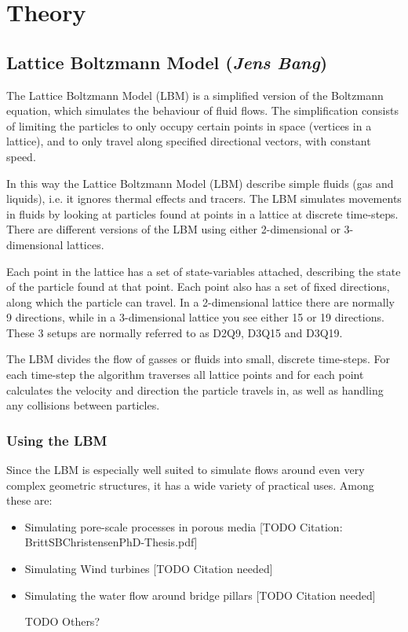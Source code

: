 \section{Theory}

\subsection{Lattice Boltzmann Model (\textit{Jens Bang})}
The Lattice Boltzmann Model (LBM) is a simplified version of the Boltzmann equation, which simulates the behaviour of fluid flows. The simplification consists of limiting the particles to only occupy certain points in space (vertices in a lattice), and to only travel along specified directional vectors, with constant speed. 

In this way the Lattice Boltzmann Model (LBM) describe simple fluids (gas and liquids), i.e. it ignores thermal effects and tracers. The LBM simulates movements in fluids by looking at particles found at points in a lattice at discrete time-steps. There are different versions of the LBM using either 2-dimensional or 3-dimensional lattices.

Each point in the lattice has a set of state-variables attached, describing the state of the particle found at that point. Each point also has a set of fixed directions, along which the particle can travel. In a 2-dimensional lattice there are normally 9 directions, while in a 3-dimensional lattice you see either 15 or 19 directions. These 3 setups are normally referred to as D2Q9, D3Q15 and D3Q19.


The LBM divides the flow of gasses or fluids into small, discrete time-steps. For each time-step the algorithm traverses all lattice points and for each point calculates the velocity and direction the particle travels in, as well as handling any collisions between particles.

\subsubsection{Using the LBM}
Since the LBM is especially well suited to simulate flows around even very complex geometric structures, it has a wide variety of practical uses. Among these are:
\begin{itemize}
\item Simulating pore-scale processes in porous media [TODO Citation: BrittSBChristensenPhD-Thesis.pdf]
\item Simulating Wind turbines [TODO Citation needed]
\item Simulating the water flow around bridge pillars [TODO Citation needed]
\item [TODO Others?]
\end{itemize}

